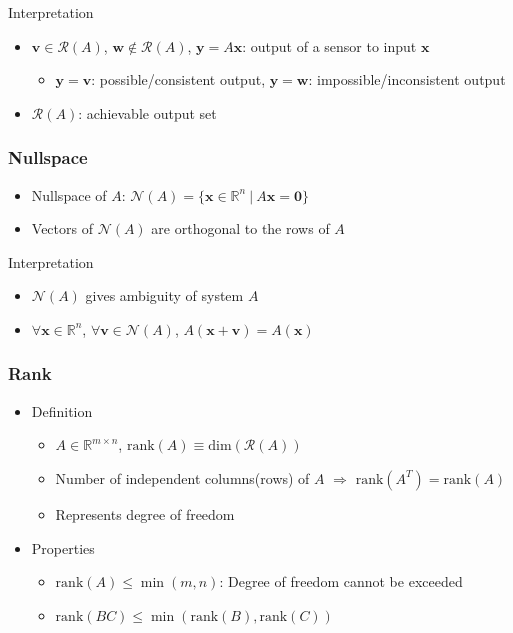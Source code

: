 Interpretation
\begin{itemize}
    \item $\mathbf{v} \in \mathcal{R}(A)$, $\mathbf{w} \notin \mathcal{R}(A)$, $\mathbf{y} = A\mathbf{x}$: output of a sensor to input $\mathbf{x}$
    \begin{itemize}
        \item $\mathbf{y} = \mathbf{v}$: possible/consistent output, $\mathbf{y} = \mathbf{w}$: impossible/inconsistent output
    \end{itemize}
    \item $\mathcal{R}(A)$: achievable output set
\end{itemize}

\subsubsection*{Nullspace}
\begin{itemize}
    \item Nullspace of $A$: $\mathcal{N}(A) = \{\mathbf{x} \in \mathbb{R}^n~|~A\mathbf{x} = \mathbf{0}\}$
    \item Vectors of $\mathcal{N}(A)$ are orthogonal to the rows of $A$
\end{itemize}

Interpretation
\begin{itemize}
    \item $\mathcal{N}(A)$ gives ambiguity of system $A$
    \item $\forall \mathbf{x} \in \mathbb{R}^n$, $\forall \mathbf{v} \in \mathcal{N}(A)$, $A(\mathbf{x} + \mathbf{v}) = A(\mathbf{x})$
\end{itemize}

\subsubsection*{Rank}
\begin{itemize}
    \item Definition
    \begin{itemize}
        \item $A \in \mathbb{R}^{m \times n}$, $\mathrm{rank}(A) \equiv \mathrm{dim}(\mathcal{R}(A))$
        \item Number of independent columns(rows) of $A$ $\Rightarrow$ $\mathrm{rank}(A^T) = \mathrm{rank}(A)$
        \item Represents degree of freedom
    \end{itemize}
    \pagebreak
    \item Properties
    \begin{itemize}
        \item $\mathrm{rank}(A) \leq \min(m, n)$: Degree of freedom cannot be exceeded
        \item $\mathrm{rank}(BC) \leq \min(\mathrm{rank}(B), \mathrm{rank}(C))$
    \end{itemize}
\end{itemize}

